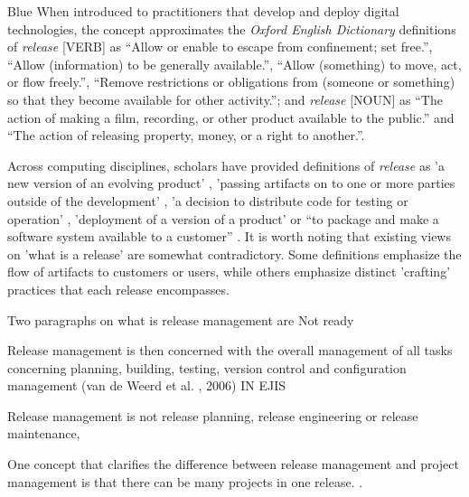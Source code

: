 \documentclass[dvipsnames]{interact}
\theoremstyle{plain}\newtheorem{theorem}{Theorem}[section]
\theoremstyle{definition}
\theoremstyle{remark}
\newenvironment{newStuff}{
    \begin{color}{Sepia}
    \begin{tabular}{|p{1.0\textwidth}|}
    \hline\\
    }
    { 
    \\\\\hline
    \end{tabular} 
    \end{color}
    }
\renewenvironment{newStuff}{}{}
\begin{document}
\begin{color}{Blue}
When introduced to practitioners that develop and deploy digital technologies, the concept approximates the \textit{Oxford English Dictionary} definitions of \textit{release} [VERB]  as 
``Allow or enable to escape from confinement; set free.'',
``Allow (information) to be generally available.'',
``Allow (something) to move, act, or flow freely.'',
``Remove restrictions or obligations from (someone or something) so that they become available for other activity.'';
and \textit{release}  [NOUN] as  ``The action of making a film, recording, or other product available to the public.'' and
``The action of releasing property, money, or a right to another.''. 


Across computing disciplines, scholars have provided definitions of  \textit{release} as 'a new version of an evolving product' \citep{Ruhe2005}, 'passing artifacts on to one or more parties outside of the development' \citep{Ould1999}, 'a decision to distribute code for testing or operation' \citep{PortWilf2013},   'deployment of a version of a product' \citep{DidarAlAlamKarim_et_al2016} or 
``to package and make a software system available to a customer'' \citep{HoekHall_et_al1997}. It is worth noting that existing views on 'what is a release' are somewhat contradictory. Some definitions emphasize the flow of artifacts to customers or users, while others emphasize distinct 'crafting' practices that each release encompasses.


\end{color}




\begin{newStuff}
 Two paragraphs on what is release management are Not ready 



 Release management is then concerned with the overall management of all tasks concerning planning, building, testing, version control and configuration management (van de Weerd et al. , 2006)
 IN EJIS

 Release management is not release planning, release engineering or release maintenance, 
 
 One concept that clarifies the difference between release management and project management is that there can be many projects in one release. \citep{Howard2016}.

  
  
\end{newStuff}
\end{document}
